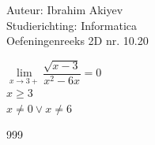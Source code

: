 \documentclass[a4paper]{article}
\begin{document}
\noindent \large Auteur: Ibrahim Akiyev \\
\noindent \large Studierichting: Informatica\\
\noindent \large Oefeningenreeks 2D nr. 10.20\\

\medskip

\normalsize

$\lim\limits_{x \to 3+} \dfrac{\sqrt{x-3}}{x^2-6x} = 0$\\

$x \geq 3$\\

$x \neq 0 \vee x \neq 6$\\


\begin{thebibliography}{999}
\end{thebibliography}
\end{document}
